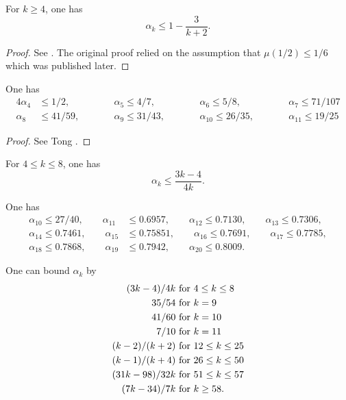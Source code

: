 \begin{lemma}\label{hl-alpha}
For $k \ge 4$, one has
\[
\alpha_k \leq 1 - \frac{3}{k + 2}.
\]
\end{lemma}
\begin{proof}
See \cite{hardy_littlewood_approximate_1923}. The original proof relied on the assumption that $\mu(1/2) \le 1/6$ which was published later. 
\end{proof}

\begin{lemma}
One has
\begin{alignat*}{4}
\alpha_4 &\le 1/2,\qquad &&\alpha_5 \le 4/7,\qquad &&\alpha_6 \le 5/8,\qquad &&\alpha_7 \le 71/107\\
\alpha_8 &\le 41/59,\qquad &&\alpha_9 \le 31/43,\qquad &&\alpha_{10} \le 26/35,\qquad &&\alpha_{11}\le 19/25
\end{alignat*}
\end{lemma}
\begin{proof}
See Tong \cite{}.
\end{proof}

\begin{theorem}\cite{heathbrown_mean_1981} For $4 \le k \le 8$, one has 
\[
\alpha_k \leq \frac{3k-4}{4k}.
\]
\end{theorem}

\begin{theorem}\cite{ivic_ouellet_1989} One has
\begin{align*}
\alpha_{10} \le 27/40,\qquad \alpha_{11} &\le 0.6957,\qquad \alpha_{12} \le 0.7130,\qquad \alpha_{13} \le 0.7306,\\
\alpha_{14} \le 0.7461,\qquad \alpha_{15} &\le 0.75851,\qquad \alpha_{16} \le 0.7691,\qquad \alpha_{17} \le 0.7785,\\
\alpha_{18} \le 0.7868,\qquad \alpha_{19} &\le 0.7942,\qquad \alpha_{20} \le 0.8009.
\end{align*}
\end{theorem}
\begin{theorem}\cite[Theorem 13.12]{ivic}  One can bound $\alpha_k$ by
    \begin{align*}
        (3k-4)/4k & \hbox{ for } 4 \leq k \leq 8 \\
        35/54 & \hbox{ for } k = 9 \\
        41/60 & \hbox{ for } k = 10 \\
        7/10 & \hbox{ for } k = 11 \\
        (k-2)/(k+2) & \hbox{ for } 12 \leq k \leq 25 \\
        (k-1)/(k+4) & \hbox{ for } 26 \leq k \leq 50 \\
        (31k-98)/32k & \hbox{ for } 51 \leq k \leq 57 \\
        (7k-34)/7k & \hbox{ for } k \geq 58.
    \end{align*}
\end{theorem}

